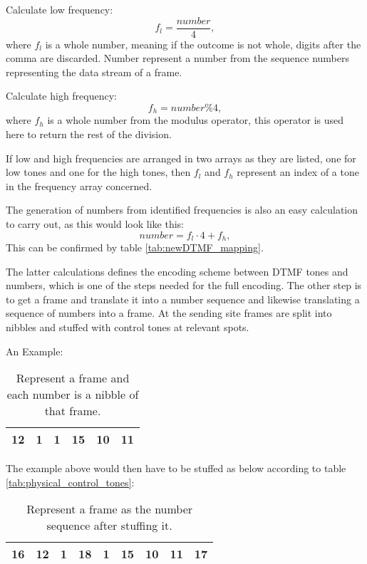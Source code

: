 	Calculate low frequency:
	\begin{equation}f_{l} = \frac{number}{4},\end{equation}
	where $f_{l}$ is a whole number, meaning if the outcome is not whole, digits after the comma are discarded. Number
	represent a number from the sequence numbers representing the data stream of a frame.
	
	Calculate high frequency:
	\begin{equation}f_{h} = number\%4,\end{equation}
	where $f_{h}$ is a whole number from the modulus operator, this operator is used here to return the rest of the division.
	
	If low and high frequencies are arranged in two arrays as they are listed, one for low tones and one for the high tones,
	then $f_{l}$ and $f_{h}$ represent an index of a tone in the frequency array concerned.
	
	The generation of numbers from identified frequencies is also an easy calculation to carry out, as this would look like this:
	\begin{equation}number = f_{l} \cdot 4 + f_{h},\end{equation}
	This can be confirmed by table \ref{tab:newDTMF_mapping}.
	
	The latter calculations defines the encoding scheme between DTMF tones and numbers, which is one of the steps needed for
	the full encoding. The other step is to get a frame and translate it into a number sequence and likewise translating a
	sequence of numbers into a frame. At the sending site frames are split into nibbles and stuffed with control tones at relevant
	spots.
	
	An Example:
	
	\begin{table}[htb]
		\begin{center}
			\begin{tabular}{|c|c|c|c|c|c|}
			\hline
			12 & 1 & 1 & 15 & 10 & 11 \\
			\hline
			\end{tabular}
		\end{center}
		\caption{Represent a frame and each number is a nibble of that frame.}
		\label{tab:physical_frame}
	\end{table}
	
	The example above would then have to be stuffed as below according to table \ref{tab:physical_control_tones}:
	
	\begin{table}[htb]
		\begin{center}
			\begin{tabular}{|c|c|c|c|c|c|c|c|c|}
			\hline
			16 & 12 & 1 & 18 & 1 & 15 & 10 & 11 & 17 \\
			\hline
			\end{tabular}
		\end{center}
		\caption{Represent a frame as the number sequence after stuffing it.}
		\label{tab:physical_stuffed_frame}
	\end{table}
	
